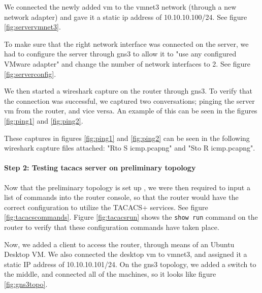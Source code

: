 \documentclass[main.tex]{subfiles}
\begin{document}

We connected the newly added vm to the vmnet3 network (through a new network adapter) and gave it a static ip address of 10.10.10.100/24. See figure \ref{fig:servervmnet3}.

To make sure that the right network interface was connected on the server, we had to configure the server through gns3 to allow it to "use any configured VMware adapter" and change the number of network interfaces to 2. See figure \ref{fig:serverconfig}.


We then started a wireshark capture on the router through gns3. To verify that the connection was successful, we captured two conversations; pinging the server vm from the router, and vice versa. An example of this can be seen in the figures \ref{fig:ping1} and \ref{fig:ping2}.


These captures in figures \ref{fig:ping1} and \ref{fig:ping2} can be seen in the following wireshark capture files attached:
"R\textunderscore to \textunderscore S \textunderscore icmp.pcapng" and "S\textunderscore to \textunderscore R \textunderscore icmp.pcapng".




\paragraph{Step 2: Testing tacacs server on preliminary topology}
\hfill \break

Now that the preliminary topology is set up , we were then required to input a list of commands into the router console, so that the router would have the correct configuration to utilize the TACACS+ services. See figure \ref{fig:tacacscommands}. Figure \ref{fig:tacacsrun} shows the \texttt{show run} command on the router to verify that these configuration commands have taken place.


\hfill \break
Now, we added a client to access the router, through means of an Ubuntu Desktop VM. We also connected the desktop vm to vmnet3, and assigned it a static IP address of 10.10.10.101/24. On the gns3 topology, we added a switch to the middle, and connected all of the machines, so it looks like figure \ref{fig:gns3topo}.
\end{document}
